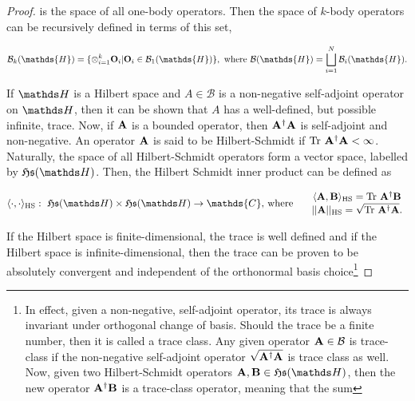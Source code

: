 \documentclass{homework}
\begin{document}
\begin{proof}
is the space of all one-body operators. Then the
space of $k$-body operators can be recursively defined in terms of this set, 

\begin{align*}
\mathcal{B}_k(\mathds{H}) = \{\otimes_{i=1}^{k} {\bf O}_i | {\bf O}_i \in \mathcal{B}_1(\mathds{H}) \}, \textnormal{ where } \mathcal{B}(\mathds{H}) = \bigsqcup_{i=1}^{N} \mathcal{B}_i(\mathds{H}).
\end{align*}


If $\hilbert$ is a Hilbert space and $A \in \mathcal{B}$ is a non-negative self-adjoint operator on $\hilbert$, then it can be shown that $A$ has a well-defined, but possible infinite, trace. Now, if ${\bf A}$ is a bounded operator, then ${\bf A}^\dagger {\bf A}$ is self-adjoint and non-negative. An operator ${\bf A}$ is said to be Hilbert-Schmidt if $\textnormal{Tr } \bf A^\dagger {\bf A} < \infty$. Naturally, the space of all Hilbert-Schmidt operators form a vector space, labelled by $\mathfrak{H}\mathfrak{s}(\hilbert)$. Then, the Hilbert Schmidt inner product can be defined as 

\begin{align*}
\langle \cdot , \cdot \rangle_{\textnormal{HS}}: \blanky \mathfrak{H}\mathfrak{s}(\hilbert) \times \mathfrak{H}\mathfrak{s}(\hilbert) \rightarrow \mathds{C}, & \textnormal{ where } &
    \begin{array}{c} 
         \langle {\bf A}, {\bf B} \rangle_{\textnormal{HS}} = \textnormal{Tr } \bf A^\dagger {\bf B} \\
         ||{\bf A}||_{\textnormal{HS}} = \sqrt{\textnormal{Tr } \bf A^\dagger {\bf A}}.
    \end{array}
\end{align*}

If the Hilbert space is finite-dimensional, the trace is well defined and if the Hilbert space is infinite-dimensional, then the trace can be proven to be absolutely convergent and independent of the orthonormal basis choice\footnote{In effect, given a non-negative, self-adjoint operator, its trace is always invariant under orthogonal change of basis. Should the trace be a finite number, then it is called a trace class. Any given operator ${\bf A} \in \mathcal{B}$ is trace-class if the non-negative self-adjoint operator $\sqrt{{\bf A^\dagger} {\bf A}}$ is trace class as well. Now, given two Hilbert-Schmidt operators ${\bf A}, {\bf B} \in \mathfrak{H}\mathfrak{s}(\hilbert)$, then the new operator $\bf A^\dagger{\bf B}$ is a trace-class operator, meaning that the sum 

}
\end{proof}
\end{document}
